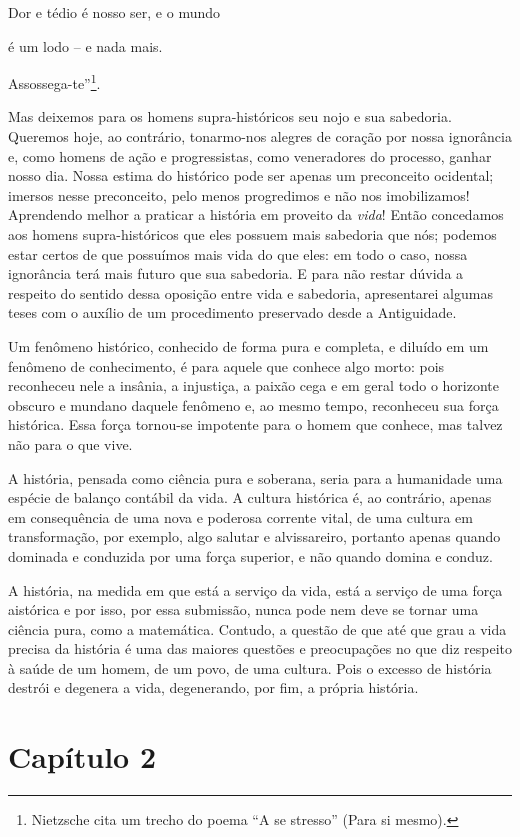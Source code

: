 Dor e tédio é nosso ser, e o mundo

é um lodo -- e nada mais.

Assossega-te''\footnote{Nietzsche cita um trecho do poema ``A se
  stresso'' (Para si mesmo).}.

Mas deixemos para os homens supra-históricos seu nojo e sua sabedoria.
Queremos hoje, ao contrário, tonarmo-nos alegres de coração por nossa
ignorância e, como homens de ação e progressistas, como veneradores do
processo, ganhar nosso dia. Nossa estima do histórico pode ser apenas um
preconceito ocidental; imersos nesse preconceito, pelo menos progredimos
e não nos imobilizamos! Aprendendo melhor a praticar a história em
proveito da \emph{vida}! Então concedamos aos homens supra-históricos
que eles possuem mais sabedoria que nós; podemos estar certos de que
possuímos mais vida do que eles: em todo o caso, nossa ignorância terá
mais futuro que sua sabedoria. E para não restar dúvida a respeito do
sentido dessa oposição entre vida e sabedoria, apresentarei algumas
teses com o auxílio de um procedimento preservado desde a Antiguidade.

Um fenômeno histórico, conhecido de forma pura e completa, e diluído em
um fenômeno de conhecimento, é para aquele que conhece algo morto: pois
reconheceu nele a insânia, a injustiça, a paixão cega e em geral todo o
horizonte obscuro e mundano daquele fenômeno e, ao mesmo tempo,
reconheceu sua força histórica. Essa força tornou-se impotente para o
homem que conhece, mas talvez não para o que vive.

A história, pensada como ciência pura e soberana, seria para a
humanidade uma espécie de balanço contábil da vida. A cultura histórica
é, ao contrário, apenas em consequência de uma nova e poderosa corrente
vital, de uma cultura em transformação, por exemplo, algo salutar e
alvissareiro, portanto apenas quando dominada e conduzida por uma força
superior, e não quando domina e conduz.

A história, na medida em que está a serviço da vida, está a serviço de
uma força aistórica e por isso, por essa submissão, nunca pode nem deve
se tornar uma ciência pura, como a matemática. Contudo, a questão de que
até que grau a vida precisa da história é uma das maiores questões e
preocupações no que diz respeito à saúde de um homem, de um povo, de uma
cultura. Pois o excesso de história destrói e degenera a vida,
degenerando, por fim, a própria história.

\chapter{Capítulo 2}\label{capuxedtulo-2}

